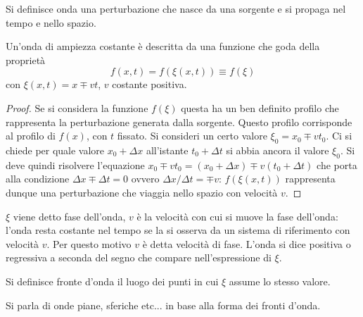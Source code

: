 \begin{defn}[Onda]
    Si definisce onda una perturbazione che nasce da una sorgente e si propaga nel tempo e
    nello spazio.
\end{defn}

\begin{obs}
    Un'onda di ampiezza costante è descritta da una funzione che goda della proprietà
    \[
        f(x,t)=f(\xi(x,t))\equiv f(\xi)
    \]
    con $\xi(x,t)=x\mp vt$, $v$ costante positiva.
\end{obs}
\begin{proof}
    Se si considera la funzione $f(\xi)$ questa ha un ben definito profilo che rappresenta la perturbazione
    generata dalla sorgente. Questo profilo corrisponde al profilo di $f(x)$, con $t$ fissato.
    Si consideri un certo valore $\xi_0=x_0\mp v t_0$. Ci si chiede per quale valore $x_0+\Delta x$
    all'istante $t_0+\Delta t$ si abbia ancora il valore $\xi_0$. Si deve quindi risolvere l'equazione
    $x_0 \mp v t_0 = (x_0+\Delta x) \mp v(t_0+\Delta t)$ che porta alla condizione $\Delta x \mp \Delta t=0$
    ovvero $\Delta x / \Delta t = \mp v$: $f(\xi(x,t))$ rappresenta dunque una perturbazione che viaggia nello
    spazio con velocità $v$.
\end{proof}
$\xi$ viene detto fase dell'onda, $v$ è la velocità con cui si muove la fase dell'onda: l'onda resta costante nel tempo
se la si osserva da un sistema di riferimento con velocità $v$. Per questo motivo $v$ è detta velocità di fase.
L'onda si dice positiva o regressiva
a seconda del segno che compare nell'espressione di $\xi$.

\begin{defn}
    Si definisce fronte d'onda il luogo dei punti in cui $\xi$ assume lo stesso valore.
\end{defn}
Si parla di  onde piane, sferiche etc... in base alla forma dei fronti d'onda.


